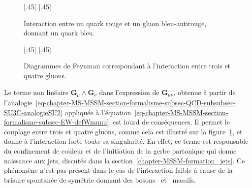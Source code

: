 \begin{figure}[h]
\centering
\vspace{\baselineskip}
[.45\textwidth]
{\vspace{\baselineskip}}
\hfill
{}[.45\textwidth]
{\vspace{\baselineskip}}

\caption[Interaction entre un quark et un gluon.]{Interaction entre un quark rouge et un gluon bleu-antirouge, donnant un quark bleu.}
\label{fig-fgraph-QCD_color_flux}

\vspace{\baselineskip}
\centering
\vspace{\baselineskip}
\subcaptionbox{\label{subfig-fgraph-ggg}}[.45\textwidth]
{\vspace{\baselineskip}}
\hfill
\subcaptionbox{\label{subfig-fgraph-gggg}}[.45\textwidth]
{\vspace{\baselineskip}}

\caption{Diagrammes de Feynman correspondant à l'interaction entre trois et quatre gluons.}
\label{fig-fgraph-QCD_3_et_4_gluons}
\end{figure}
\par Le terme non linéaire $\bm{G}_\mu\wedge\bm{G}_\nu$ dans l'expression de $\bm{G}_{\mu\nu}$, obtenue à partir de l'analogie~\eqref{eq-chapter-MS-MSSM-section-formalisme-subsec-QCD-subsubsec-SU3C-analogieSU2} appliquée à l'équation~\eqref{eq-chapter-MS-MSSM-section-formalisme-subsec-EW-defWmunu}, est lourd de conséquences.
Il permet le couplage entre trois et quatre gluons, comme cela est illustré sur la figure~\ref{fig-fgraph-QCD_3_et_4_gluons}, et donne à l'interaction forte toute sa singularité.
En effet, ce terme est responsable du confinement de couleur et de l'initiation de la gerbe partonique qui donne naissance aux jets, discutés dans la section~\ref{chapter-MSSM-formation_jets}.
Ce phénomène n'est pas présent dans le cas de l'interaction faible à cause de la brisure spontanée de symétrie donnant des bosons \Wboson\ et \Zboson\ massifs.
